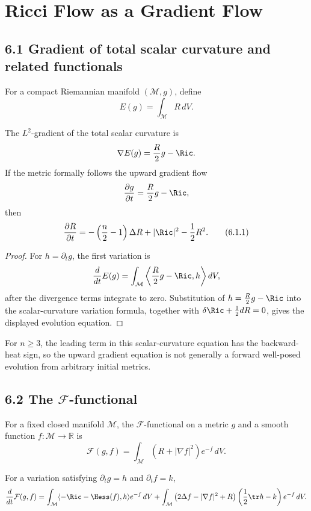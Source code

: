 \chapter{Ricci Flow as a Gradient Flow}

\section{6.1 \quad Gradient of total scalar curvature and related functionals}

For a compact Riemannian manifold $(\mathcal M,g)$, define
\[
E(g)=\int_{\mathcal M}R\,dV.
\]

\begin{proposition}
\label{topping-gradient-flow-total-scalar-curvature-gradient}
The $L^2$-gradient of the total scalar curvature is
\[
\nabla E(g)=\frac{R}{2}g-\Ric.
\]
If the metric formally follows the upward gradient flow
\[
\frac{\partial g}{\partial t}=\frac{R}{2}g-\Ric,
\]
then
\[
\frac{\partial R}{\partial t}
=-\left(\frac{n}{2}-1\right)\Delta R+|\Ric|^2-\frac12R^2.
\tag{6.1.1}
\]
\end{proposition}

\begin{proof}
\sketch For $h=\partial_tg$, the first variation is
\[
\frac{d}{dt}E(g)=\int_{\mathcal M}
\left\langle\frac{R}{2}g-\Ric,h\right\rangle dV,
\]
after the divergence terms integrate to zero. Substitution of
$h=\frac{R}{2}g-\Ric$ into the scalar-curvature variation formula, together
with $\delta\Ric+\frac12dR=0$, gives the displayed evolution equation.
\end{proof}

For $n\geq3$, the leading term in this scalar-curvature equation has the
backward-heat sign, so the upward gradient equation is not generally a
forward well-posed evolution from arbitrary initial metrics.

\section{6.2 \quad The $\mathcal{F}$-functional}

For a fixed closed manifold $\mathcal M$, the $\mathcal F$-functional on a
metric $g$ and a smooth function $f:\mathcal M\to\mathbb R$ is
\[
\mathcal F(g,f)=\int_{\mathcal M}(R+|\nabla f|^2)e^{-f}\,dV.
\]

\begin{proposition}
\label{topping-gradient-flow-f-functional-first-variation}
For a variation satisfying $\partial_tg=h$ and $\partial_tf=k$,
\[
\frac{d}{dt}\mathcal F(g,f)
=\int_{\mathcal M}\langle-\Ric-\Hess(f),h\rangle e^{-f}\,dV
+\int_{\mathcal M}\left(2\Delta f-|\nabla f|^2+R\right)
\left(\frac12\tr h-k\right)e^{-f}\,dV.
\]
\end{proposition}

